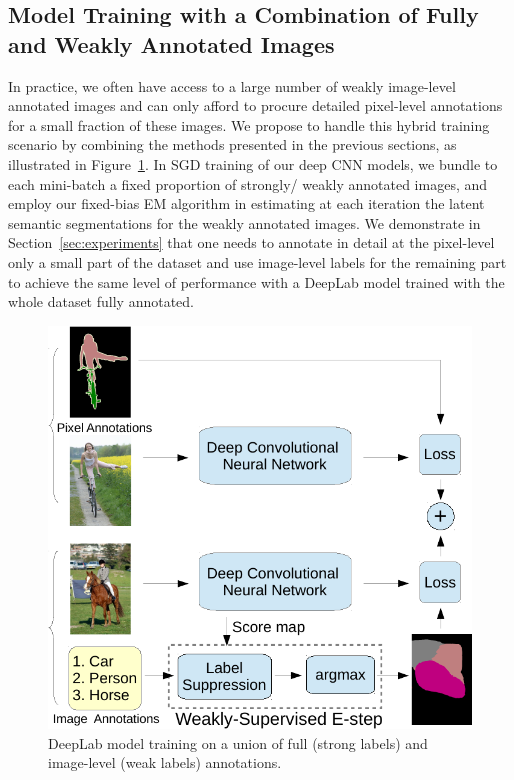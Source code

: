 \subsection{Model Training with a Combination of Fully and Weakly Annotated Images}

In practice, we often have access to a large number of weakly
image-level annotated images and can only afford to procure detailed
pixel-level annotations for a small fraction of these images. We
propose to handle this hybrid training scenario by combining the
methods presented in the previous sections, as illustrated in
Figure~\ref{fig:model_illustrations_twoEnd}. In SGD training of our
deep CNN models, we bundle to each mini-batch a fixed proportion of
strongly/ weakly annotated images, and employ our fixed-bias EM
algorithm in estimating at each iteration the latent semantic
segmentations for the weakly annotated images. We demonstrate in
Section~\ref{sec:experiments} that one needs to annotate in detail at
the pixel-level only a small part of the dataset and use image-level
labels for the remaining part to achieve the same level of performance
with a DeepLab model trained with the whole dataset fully annotated.

\begin{figure}[htbp!]
  \centering
  \includegraphics[width=0.9\linewidth]{fig/model_train_twoEnd.pdf} 
  \caption{DeepLab model training on a union of full (strong labels) 
    and image-level (weak labels) annotations.}
  \label{fig:model_illustrations_twoEnd}
\end{figure}

